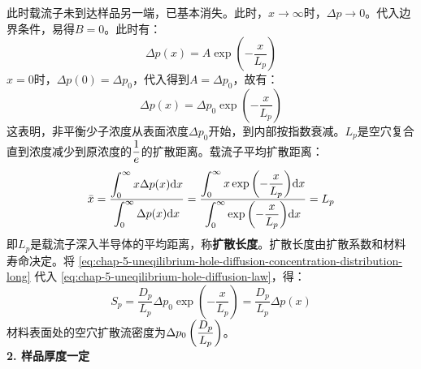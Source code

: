 此时载流子未到达样品另一端，已基本消失。此时，$x\rightarrow\infty$时，$\Delta p\rightarrow 0$。代入边界条件，易得$B=0$。此时有：
\begin{equation}
    \Delta p(x)=A\exp{\left(-\frac{x}{L_p}\right)}
\end{equation}
$x=0$时，$\Delta p(0)=\Delta p_0$，代入得到$A=\Delta p_0$，故有：
\begin{equation}
    \Delta p(x)=\Delta p_0\exp{\left(-\frac{x}{L_p}\right)}\label{eq:chap-5-uneqilibrium-hole-diffusion-concentration-distribution-long}
\end{equation}
这表明，非平衡少子浓度从表面浓度$\Delta p_0$开始，到内部按指数衰减。$L_p$是空穴复合直到浓度减少到原浓度的$\displaystyle\frac{1}{e}$的扩散距离。载流子平均扩散距离：
\begin{equation}
    \Bar{x}=\frac{\displaystyle\int_0^\infty x\Delta p(x)\mathrm{d}x}{\displaystyle\int_0^\infty \Delta p(x)\mathrm{d}x}=\frac{\displaystyle\int_0^\infty x\exp{\left(-\frac{x}{L_p}\right)}\mathrm{d}x}{\displaystyle\int_0^\infty\exp{\left(-\frac{x}{L_p}\right)}\mathrm{d}x}=L_p
\end{equation}
即$L_p$是载流子深入半导体的平均距离，称\textbf{扩散长度}。扩散长度由扩散系数和材料寿命决定。将
\autoref{eq:chap-5-uneqilibrium-hole-diffusion-concentration-distribution-long} 代入 \autoref{eq:chap-5-uneqilibrium-hole-diffusion-law}，得：
\begin{equation}
    S_p=\frac{D_p}{L_p}\Delta p_0\exp{\left(-\frac{x}{L_p}\right)}=\frac{D_p}{L_p}\Delta p(x)
\end{equation}
材料表面处的空穴扩散流密度为$\displaystyle \Delta p_0\left(\frac{D_p}{L_p}\right)$。\vspace{1ex}\\
\textbf{2. 样品厚度一定}

